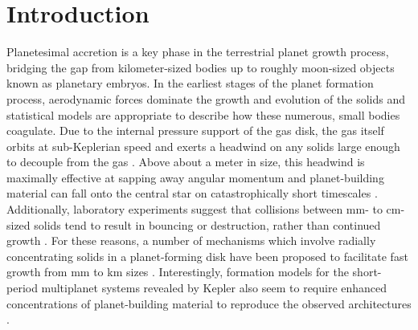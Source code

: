 \documentclass[twocolumn]{aastex63}
\begin{document}

\section{Introduction} \label{sec:intro}

Planetesimal accretion is a key phase in the terrestrial planet growth process, bridging the gap from kilometer-sized bodies up to roughly moon-sized objects known as planetary embryos. In the earliest stages of the planet formation process, aerodynamic forces dominate the growth and evolution of the solids and statistical models \citep{johansen14, birnstiel16} are appropriate to describe how these numerous, small bodies coagulate. Due to the internal pressure support of the gas disk, the gas itself orbits at sub-Keplerian speed and exerts a headwind on any solids large enough to decouple from the gas \citep{weidenschilling77}. Above about a meter in size, this headwind is maximally effective at sapping away angular momentum and planet-building material can fall onto the central star on catastrophically short timescales \citep{weidenschilling77, nakagawa86}. Additionally, laboratory experiments suggest that collisions between mm- to cm- sized solids tend to result in bouncing or destruction, rather than continued growth \citep{blum93, beitz11, colwell03}. For these reasons, a number of mechanisms which involve radially concentrating solids in a planet-forming disk have been proposed to facilitate fast growth from mm to km sizes \citep{johansen07, lyra08, bai10}. Interestingly, formation models for the short-period multiplanet systems revealed by Kepler \citep{fabrycky14} also seem to require enhanced concentrations of planet-building material to reproduce the observed architectures \citep{raymond07, hansen12}.
\end{document}
